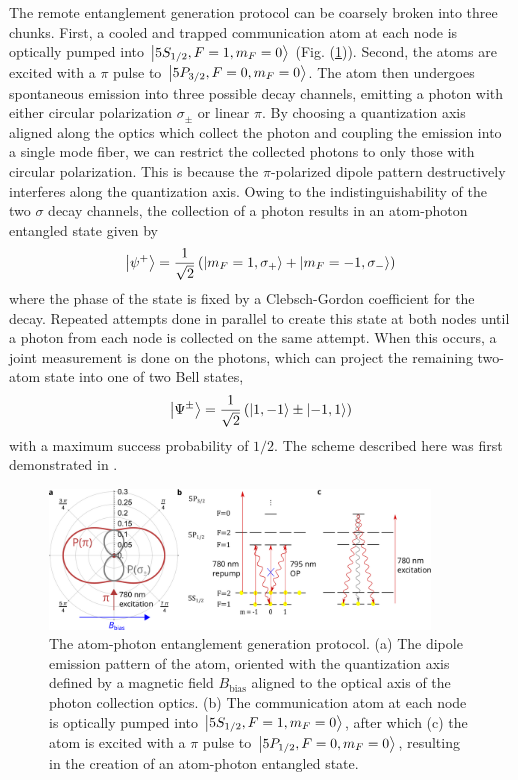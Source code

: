 The remote entanglement generation protocol can be coarsely broken into three chunks. First, a cooled and trapped communication atom at each node is optically pumped into $\ket{5S_{1/2},F=1,m_F=0}$ (Fig. (\ref{fig:entanglement_generation_steps})). Second, the atoms are excited with a $\pi$ pulse to $\ket{5P_{3/2},F=0,m_F=0}$. The atom then undergoes spontaneous emission into three possible decay channels, emitting a photon with either circular polarization $\sigma_{\pm}$ or linear $\pi$. By choosing a quantization axis aligned along the optics which collect the photon and coupling the emission into a single mode fiber, we can restrict the collected photons to only those with circular polarization. This is because the $\pi$-polarized dipole pattern destructively interferes along the quantization axis. Owing to the indistinguishability of the two $\sigma$ decay channels, the collection of a photon results in an atom-photon entangled state given by
\begin{equation}\label{eq:atomphotonstates}
    \ket{\psi^+}=\frac{1}{\sqrt{2}}\left(\ket{m_F=1, \sigma_+}+\ket{m_F=-1,\sigma_-}\right)
\end{equation}
where the phase of the state is fixed by a Clebsch-Gordon coefficient for the decay. Repeated attempts done in parallel to create this state at both nodes until a photon from each node is collected on the same attempt. When this occurs, a joint measurement is done on the photons, which can project the remaining two-atom state into one of two Bell states,
\begin{equation}\label{eq:atomatomstates}
    \ket{\Psi^{\pm}} =\frac{1}{\sqrt{2}}\left(\ket{1,-1}\pm\ket{-1,1}\right)
\end{equation}
with a maximum success probability of $1/2$. The scheme described here was first demonstrated in \cite{Hofmann2012}.

\begin{figure}[!ht]
    \centering
    \includegraphics[width=0.9\textwidth]{Images/rb87_atomphoton_entanglement_and_photon_emission_pattern2.pdf}
    \caption{The atom-photon entanglement generation protocol. (a) The dipole emission pattern of the atom, oriented with the quantization axis defined by a magnetic field $B_{\text{bias}}$ aligned to the optical axis of the photon collection optics. (b) The communication atom at each node is optically pumped into $\ket{5S_{1/2},F=1,m_F=0}$, after which (c) the atom is excited with a $\pi$ pulse to $\ket{5P_{1/2},F=0,m_F=0}$, resulting in the creation of an atom-photon entangled state.}
    \label{fig:entanglement_generation_steps}
\end{figure}


